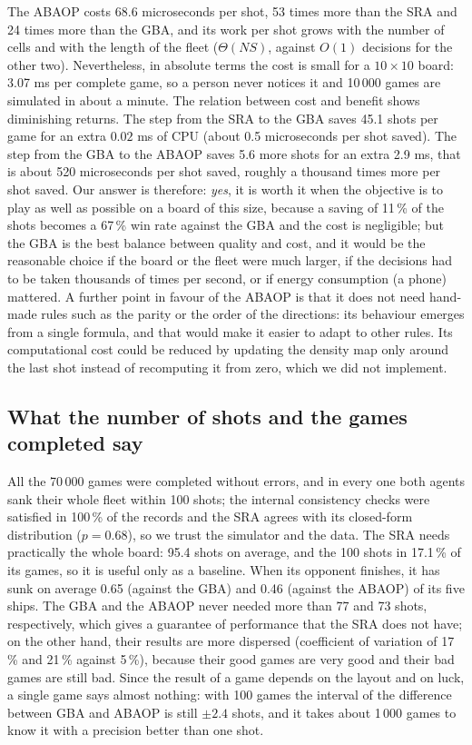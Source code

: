 \documentclass[letterpaper,11pt]{article} %
\begin{document}
The ABAOP costs 68.6 microseconds per shot, 53 times more than the SRA and 24 times more than the GBA, and its work per shot grows with the number of cells and with the length of the fleet ($\Theta(NS)$, against $O(1)$ decisions for the other two). Nevertheless, in absolute terms the cost is small for a $10\times10$ board: 3.07 ms per complete game, so a person never notices it and 10\,000 games are simulated in about a minute.
The relation between cost and benefit shows diminishing returns. The step from the SRA to the GBA saves 45.1 shots per game for an extra $0.02$ ms of CPU (about 0.5 microseconds per shot saved). The step from the GBA to the ABAOP saves 5.6 more shots for an extra 2.9 ms, that is about 520 microseconds per shot saved, roughly a thousand times more per shot saved.
Our answer is therefore: \emph{yes}, it is worth it when the objective is to play as well as possible on a board of this size, because a saving of 11\,\% of the shots becomes a 67\,\% win rate against the GBA and the cost is negligible; but the GBA is the best balance between quality and cost, and it would be the reasonable choice if the board or the fleet were much larger, if the decisions had to be taken thousands of times per second, or if energy consumption (a phone) mattered. A further point in favour of the ABAOP is that it does not need hand-made rules such as the parity or the order of the directions: its behaviour emerges from a single formula, and that would make it easier to adapt to other rules. Its computational cost could be reduced by updating the density map only around the last shot instead of recomputing it from zero, which we did not implement.

\subsection{What the number of shots and the games completed say}

All the 70\,000 games were completed without errors, and in every one both agents sank their whole fleet within 100 shots; the internal consistency checks were satisfied in 100\,\% of the records and the SRA agrees with its closed-form distribution ($p=0.68$), so we trust the simulator and the data.
The SRA needs practically the whole board: 95.4 shots on average, and the 100 shots in 17.1\,\% of its games, so it is useful only as a baseline. When its opponent finishes, it has sunk on average 0.65 (against the GBA) and 0.46 (against the ABAOP) of its five ships.
The GBA and the ABAOP never needed more than 77 and 73 shots, respectively, which gives a guarantee of performance that the SRA does not have; on the other hand, their results are more dispersed (coefficient of variation of 17\,\% and 21\,\% against 5\,\%), because their good games are very good and their bad games are still bad.
Since the result of a game depends on the layout and on luck, a single game says almost nothing: with 100 games the interval of the difference between GBA and ABAOP is still $\pm2.4$ shots, and it takes about 1\,000 games to know it with a precision better than one shot.
\end{document}
